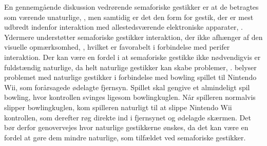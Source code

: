 En gennemgående diskussion vedrørende semaforiske gestikker er at de betragtes som værende unaturlige, \parencite[s. 1961]{PDF:AStudyOnTheUseOfSemaphoricGestures}, men samtidig er det den form for gestik, der er mest udbredt indenfor interaktion med allestedsværende elektroniske apparater, \parencite[s. 28]{PDF:ATaxonomyOfGestures}. Ydermere understøtter semaforiske gestikker interaktion, der ikke afhænger af den visuelle opmærksomhed, \parencite[s. 1964]{PDF:AStudyOnTheUseOfSemaphoricGestures}, hvilket er favorabelt i forbindelse med perifer interaktion. Der kan være en fordel i at semaforiske gestikke ikke nødvendigvis er fuldstændig naturlige, da helt naturlige gestikker kan skabe problemer, \parencite[s. 9]{PDF:NaturalUserInterfaces}. \textcite[s. 9]{PDF:NaturalUserInterfaces} belyser problemet med naturlige gestikker i forbindelse med bowling spillet til Nintendo Wii, som forårsagede ødelagte fjernsyn. Spillet skal gengive et almindeligt spil bowling, hvor kontrollen svinges ligesom bowlingkuglen. Når spilleren normalvis slipper bowlingkuglen, kom spilleren naturligt til at slippe Nintendo Wii kontrollen, som derefter røg direkte ind i fjernsynet og ødelagde skærmen. Det bør derfor genovervejes hvor naturlige gestikkerne ønskes, da det kan være en fordel at gøre dem mindre naturlige, som tilfældet ved semaforiske gestikker.
%
